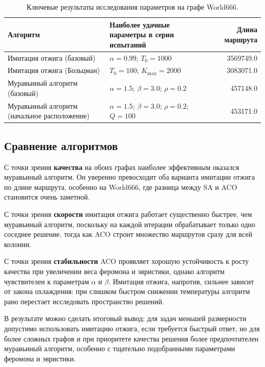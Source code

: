 \documentclass[12pt,a4paper]{article}
\begin{document}
\begin{table}[H]
    \centering
    \caption{Ключевые результаты исследования параметров на графе World666.}
    \begin{tabularx}{\textwidth}{p{3.6cm}Xr}
        \toprule
        Алгоритм & Наиболее удачные параметры в серии испытаний & Длина маршрута \\
        \midrule
        Имитация отжига (базовый) & $\alpha = 0.99$; $T_0 = 1000$ & 3569749.0 \\
        Имитация отжига (Больцман) & $T_0 = 100$; $K_{\max} = 2000$ & 3083071.0 \\
        Муравьиный алгоритм (базовый) & $\alpha = 1.5$; $\beta = 3.0$; $\rho = 0.2$ & 457148.0 \\
        Муравьиный алгоритм (начальное расположение) & $\alpha = 1.5$; $\beta = 3.0$; $\rho = 0.2$; $Q = 100$ & 453171.0 \\
        \bottomrule
    \end{tabularx}
\end{table}

\subsection{Сравнение алгоритмов}

С точки зрения \textbf{качества} на обоих графах наиболее эффективным оказался
муравьиный алгоритм. Он уверенно превосходит оба варианта имитации отжига по длине
маршрута, особенно на World666, где разница между SA и ACO становится очень заметной.

С точки зрения \textbf{скорости} имитация отжига работает существенно быстрее, чем
муравьиный алгоритм, поскольку на каждой итерации обрабатывает только одно соседнее
решение, тогда как ACO строит множество маршрутов сразу для всей колонии.

С точки зрения \textbf{стабильности} ACO проявляет хорошую устойчивость к росту
качества при увеличении веса феромона и эвристики, однако алгоритм чувствителен к
параметрам $\alpha$ и $\beta$. Имитация отжига, напротив, сильнее зависит от закона
охлаждения: при слишком быстром снижении температуры алгоритм рано перестает
исследовать пространство решений.

В результате можно сделать итоговый вывод: для задач меньшей размерности допустимо
использовать имитацию отжига, если требуется быстрый ответ, но для более сложных
графов и при приоритете качества решения более предпочтителен муравьиный алгоритм,
особенно с тщательно подобранными параметрами феромона и эвристики.
\end{document}
